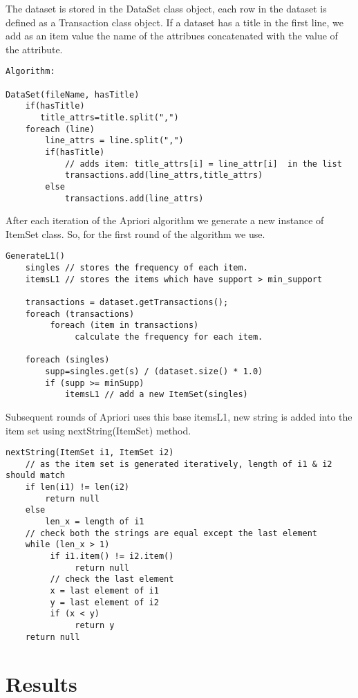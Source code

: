 \documentclass[11pt]{article}
\begin{document}
The dataset is stored in the DataSet class object, each row in the dataset is defined as a Transaction class object. If a dataset has a title in the first line, we add as an item value
the name of the attribues concatenated with the value of the attribute.

\begin{verbatim}
Algorithm:

DataSet(fileName, hasTitle)
    if(hasTitle)
       title_attrs=title.split(",")
    foreach (line)
        line_attrs = line.split(",")
        if(hasTitle)
            // adds item: title_attrs[i] = line_attr[i]  in the list
            transactions.add(line_attrs,title_attrs)
        else
            transactions.add(line_attrs)
\end{verbatim}

After each iteration of the Apriori algorithm we generate a new instance of ItemSet class.
So, for the first round of the algorithm we use.

\begin{verbatim}
GenerateL1()
    singles // stores the frequency of each item.
    itemsL1 // stores the items which have support > min_support
    
    transactions = dataset.getTransactions();
    foreach (transactions)
         foreach (item in transactions)
              calculate the frequency for each item.
    
    foreach (singles)
        supp=singles.get(s) / (dataset.size() * 1.0)
        if (supp >= minSupp) 
            itemsL1 // add a new ItemSet(singles)
\end{verbatim}

Subsequent rounds of Apriori uses this base itemsL1, new string is added into the item set using nextString(ItemSet) method.

\begin{verbatim}
nextString(ItemSet i1, ItemSet i2)
    // as the item set is generated iteratively, length of i1 & i2 should match
    if len(i1) != len(i2)
        return null        
    else 
        len_x = length of i1
    // check both the strings are equal except the last element
    while (len_x > 1)
         if i1.item() != i2.item()
              return null
         // check the last element
         x = last element of i1
         y = last element of i2
         if (x < y)
              return y
    return null
\end{verbatim}


\section{Results}
\end{document}
